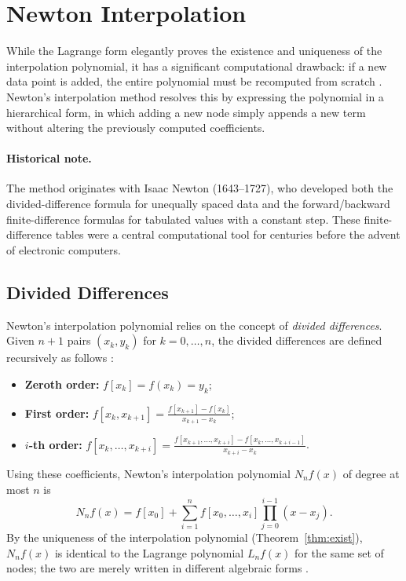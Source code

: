 \documentclass[12pt, a4paper]{article}
\theoremstyle{plain}
\theoremstyle{definition}
\theoremstyle{remark}
\begin{document}
\newpage
\section{Newton Interpolation}

While the Lagrange form elegantly proves the existence and uniqueness of the interpolation polynomial, it has a significant computational drawback: if a new data point is added, the entire polynomial must be recomputed from scratch \cite{micula5, runge}. Newton's interpolation method resolves this by expressing the polynomial in a hierarchical form, in which adding a new node simply appends a new term without altering the previously computed coefficients.

\paragraph{Historical note.} The method originates with Isaac Newton (1643--1727), who developed both the divided-difference formula for unequally spaced data and the forward/backward finite-difference formulas for tabulated values with a constant step. These finite-difference tables were a central computational tool for centuries before the advent of electronic computers.

\subsection{Divided Differences}

Newton's interpolation polynomial relies on the concept of \emph{divided differences}. Given $n+1$ pairs $(x_k, y_k)$ for $k = 0, \dots, n$, the divided differences are defined recursively as follows \cite{isaacson, micula5}:
\begin{itemize}
    \item \textbf{Zeroth order:} $f[x_k] = f(x_k) = y_k$;
    \item \textbf{First order:} $\displaystyle f[x_k, x_{k+1}] = \frac{f[x_{k+1}] - f[x_k]}{x_{k+1} - x_k}$;
    \item \textbf{$i$-th order:} $\displaystyle f[x_k, \dots, x_{k+i}] = \frac{f[x_{k+1}, \dots, x_{k+i}] - f[x_k, \dots, x_{k+i-1}]}{x_{k+i} - x_k}$.
\end{itemize}

Using these coefficients, Newton's interpolation polynomial $N_n f(x)$ of degree at most $n$ is
\begin{equation}\label{eq:newton}
    N_n f(x) = f[x_0] + \sum_{i=1}^n f[x_0, \dots, x_i] \prod_{j=0}^{i-1} (x - x_j).
\end{equation}
By the uniqueness of the interpolation polynomial (Theorem~\ref{thm:exist}), $N_n f(x)$ is identical to the Lagrange polynomial $L_n f(x)$ for the same set of nodes; the two are merely written in different algebraic forms \cite{micula5}.
\end{document}
